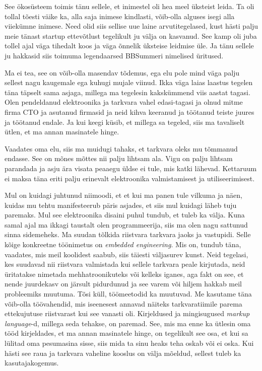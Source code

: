 See ökosüsteem toimis tänu sellele, et inimestel oli hea meel üksteist leida. 
Ta oli tollal tõesti väike ka, alla saja inimese kindlasti,  
võib-olla alguses isegi alla viiekümne inimese. Need olid siis sellise uue 
laine  arvutitegelased, kust hästi palju meie tänast  startup ettevõtlust 
tegelikult ju välja on kasvanud. See kamp oli juba tollel ajal väga tihedalt 
koos ja väga õnnelik üksteise leidmise üle. Ja tänu sellele ju hakkasid siis 
toimuma legendaarsed BBSummeri nimelised üritused. 


Ma ei tea, see on võib-olla masendav tõdemus, ega elu pole mind väga palju 
sellest nagu kaugemale ega kuhugi mujale viinud. Ikka väga laias laastus 
tegelen täna täpselt sama asjaga, millega ma tegelesin kakskümmend viis aastat 
tagasi. Olen pendeldanud elektroonika ja tarkvara vahel edasi-tagasi ja 
olnud mitme firma CTO ja  asutanud firmasid ja neid kihva keeranud ja töötanud 
teiste juures ja töötanud endale. Ja kui keegi küsib, et millega sa tegeled, 
siis ma tavaliselt ütlen, et ma annan masinatele hinge. 


Vaadates oma elu, siis ma muidugi tahaks, et tarkvara oleks mu tõmmanud endasse. See on mõnes mõttes nii palju  lihtsam ala. Vigu on palju 
lihtsam parandada ja asju ära visata peaaegu üldse ei tule, mis katki lähevad. 
Kettaruum ei maksa täna eriti palju erinevalt elektroonika valmistamisest ja
utiliseerimisest.

Mul on kuidagi juhtunud niimoodi, et et kui ma panen 
tule vilkuma ja näen, kuidas mu tehtu  manifesteerub päris  asjades, et 
siis mul kuidagi läheb tuju paremaks. Mul see elektroonika disaini puhul 
tundub, et tuleb ka välja. Kuna samal ajal ma ikkagi taustalt olen  
programmeerija, siis ma olen nagu sattunud sinna sidemeheks. Ma suudan tõlkida 
riistvara tarkvara jaoks ja vastupidi. Selle kõige konkreetne töönimetus on 
\emph{embedded engineering}. Mis on, tundub täna, vaadates, mis meil koolidest 
saabub, siis täiesti väljasurev kunst. Neid tegelasi, kes suudavad nii 
riistvara valmistada kui sellele tarkvara peale kirjutada, neid üritatakse 
nimetada mehhatroonikuteks või kelleks iganes, aga fakt on see, et nende 
juurdekasv on järsult pidurdunud ja see varem või hiljem hakkab meil 
probleemiks muutuma. Tõsi küll, töömeetodid ka muutuvad. Me kasutame täna
võib-olla töövahendid, mis iseenesest annavad näiteks tarkvaratiimile parema 
ettekujutuse riistvarast kui see vanasti oli. Kirjeldused ja mingisugused 
\emph{markup language}-d, millega  seda tehakse, on paremad. See, mis ma enne ka 
ütlesin oma tööd kirjeldades, et ma annan masinatele hinge, on 
tegelikult see osa, et kui sa lülitad oma pesumasina sisse, siis mida ta sinu 
heaks teha oskab või ei oska. Kui hästi see raua ja tarkvara vaheline kooslus 
on välja mõeldud, sellest tuleb ka kasutajakogemus. 

